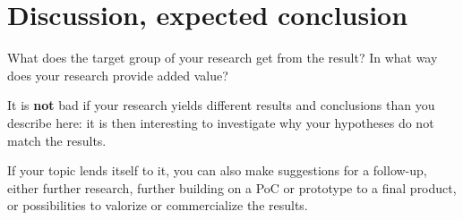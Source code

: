 \documentclass[english]{hogent-article}
\begin{document}
\section{Discussion, expected conclusion}%
\label{sec:discussion-conclusion}

What does the target group of your research get from the result? In what way does your research provide added value?

It is \textbf{not} bad if your research yields different results and conclusions than you describe here: it is then interesting to investigate why your hypotheses do not match the results.

If your topic lends itself to it, you can also make suggestions for a follow-up, either further research, further building on a PoC or prototype to a final product, or possibilities to valorize or commercialize the results.


\printbibliography[heading=bibintoc]
\end{document}
